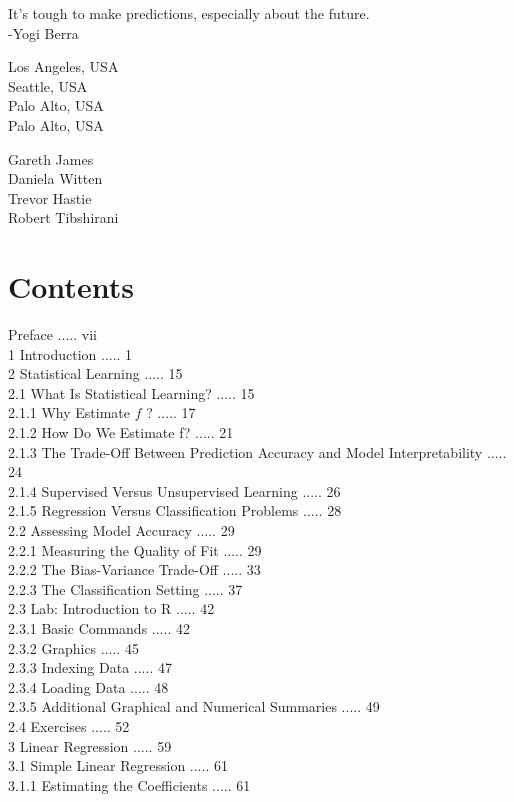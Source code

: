 \documentclass[10pt]{article}
\begin{document}
It's tough to make predictions, especially about the future.\\
-Yogi Berra

Los Angeles, USA\\
Seattle, USA\\
Palo Alto, USA\\
Palo Alto, USA

Gareth James\\
Daniela Witten\\
Trevor Hastie\\
Robert Tibshirani

\section*{Contents}
Preface ..... vii\\
1 Introduction ..... 1\\
2 Statistical Learning ..... 15\\
2.1 What Is Statistical Learning? ..... 15\\
2.1.1 Why Estimate $f$ ? ..... 17\\
2.1.2 How Do We Estimate f? ..... 21\\
2.1.3 The Trade-Off Between Prediction Accuracy and Model Interpretability ..... 24\\
2.1.4 Supervised Versus Unsupervised Learning ..... 26\\
2.1.5 Regression Versus Classification Problems ..... 28\\
2.2 Assessing Model Accuracy ..... 29\\
2.2.1 Measuring the Quality of Fit ..... 29\\
2.2.2 The Bias-Variance Trade-Off ..... 33\\
2.2.3 The Classification Setting ..... 37\\
2.3 Lab: Introduction to R ..... 42\\
2.3.1 Basic Commands ..... 42\\
2.3.2 Graphics ..... 45\\
2.3.3 Indexing Data ..... 47\\
2.3.4 Loading Data ..... 48\\
2.3.5 Additional Graphical and Numerical Summaries ..... 49\\
2.4 Exercises ..... 52\\
3 Linear Regression ..... 59\\
3.1 Simple Linear Regression ..... 61\\
3.1.1 Estimating the Coefficients ..... 61\\
\end{document}
